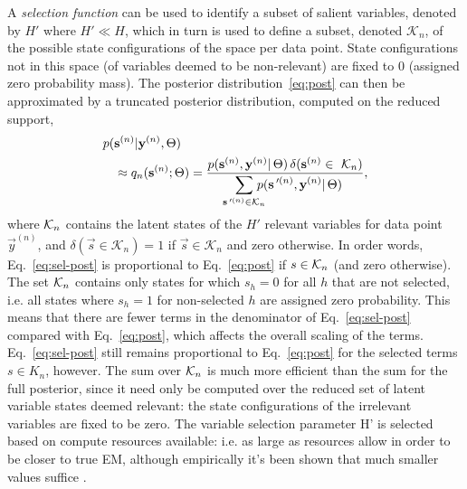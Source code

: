 A \textit{selection function} can be used to identify a  subset
of salient variables, denoted by $H'$ where $H' \ll H$, which in turn is used to define a subset, denoted $\mathcal{K}_n$, of the possible state configurations of the space per data point. 
State configurations not in this space (of variables deemed to be non-relevant) are fixed to $0$ (assigned zero probability mass).
%
The posterior distribution~\eqref{eq:post} can then be approximated by a truncated posterior distribution, computed on the reduced support,
%
\vspace{-.1cm}
\begin{align}
\label{eq:sel-post}
p(&\vec{s}^{(n)}|\vec{y}^{(n)},\Theta) \nonumber\\
&\approx q_n(\vec{s}^{(n)};\Theta) = \frac{p(\vec{s}^{(n)},\vec{y}^{(n)}|\,\Theta) \,\delta(\vec{s}^{(n)}\in\,\,\Kn)}
{\disS\hspace{-1.5mm}\sum_{\vec{s}\Prime^{(n)}\in\mathcal{K}_n}\hspace{-3mm} p(\vec{s}\Prime^{(n)},\vec{y}^{(n)}|\,\Theta)},
\end{align}
\normalsize
%
where $\mathcal{K}_{n}$ contains the latent states of the $H'$ relevant variables for data point
$\vec{y}^{(n)}$, and $\delta(\vec{s}\in\mathcal{K}_n)=1$ if
$\vec{s}\in\mathcal{K}_n$ and zero otherwise.
In order words, Eq.~\eqref{eq:sel-post} is proportional to Eq.~\eqref{eq:post} if $s \in \mathcal{K}_{n}$ (and zero otherwise). 
The set $\mathcal{K}_{n}$ contains only states for which $s_h=0$ for all $h$ that are not selected, i.e. all states where $s_h=1$ for non-selected $h$ are assigned zero probability.
This means that there are fewer terms in the denominator of Eq.~\eqref{eq:sel-post} compared with Eq.~\eqref{eq:post}, which affects the overall scaling of the terms. Eq.~\eqref{eq:sel-post} still remains proportional to Eq.~\eqref{eq:post} for the selected terms $s\in K_n$, however.
The sum over $\mathcal{K}_{n}$ is much more efficient than the sum for the full posterior, since it need only be computed over the reduced set of latent variable states deemed relevant: the state configurations of the irrelevant variables are fixed to be zero.
The variable selection parameter H' is selected based on compute resources available: i.e. as large as resources allow in order to be closer to true EM, although empirically it's been shown that much smaller values suffice  \citep[see e.g.][App. B on complexity-accuracy trade-offs]{SheikhEtAl2014}.

